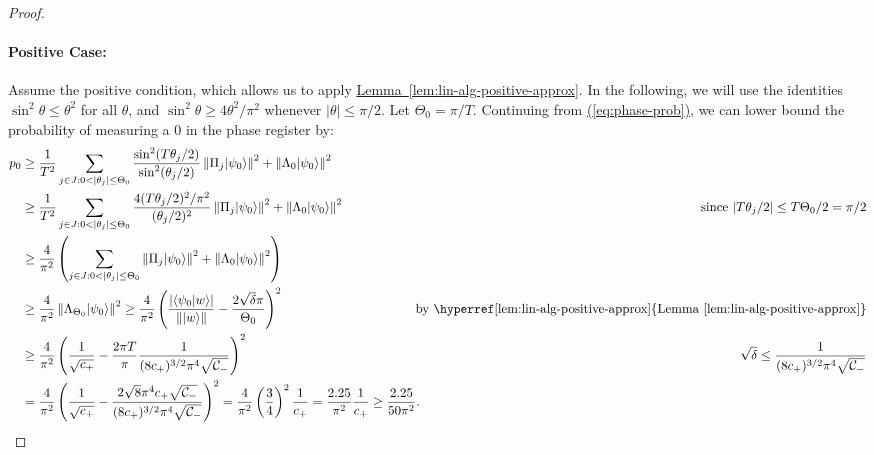 \documentclass{article}
\newcommand{\eq}[1]{\hyperref[eq:#1]{(\ref*{eq:#1})}}
\newcommand{\lem}[1]{\hyperref[lem:#1]{Lemma~\ref*{lem:#1}}}
\def\ket#1{{\lvert}#1\rangle}
\renewcommand{\>}{\rangle}
\newcommand{\<}{\langle}
\renewcommand{\(}{\left(}
\renewcommand{\)}{\right)}
\def\braket#1#2{{{\langle}#1\vert}#2\rangle}
\def\norm#1{\left\| #1 \right\|}
\begin{document}
\begin{proof}
\paragraph{Positive Case:} Assume the positive condition, which allows us to apply \lem{lin-alg-positive-approx}. In the following, we will use the identities $\sin^2\theta\leq \theta^2$ for all $\theta$, and $\sin^2\theta\geq 4\theta^2/\pi^2$ whenever $|\theta|\leq \pi/2$. 
Let $\Theta_0=\pi/T$. 
Continuing from \eq{phase-prob}, 
we can lower bound the probability of measuring a 0 in the phase register by:
\begin{align*}
p_0 &\geq \frac{1}{T^2}\sum_{j\in J:0<|\theta_j|\leq\Theta_0}\frac{\sin^2(T\theta_j/2)}{\sin^2(\theta_j/2)}\norm{\Pi_j\ket{\psi_0}}^2+\norm{\Lambda_0\ket{\psi_0}}^2\\
&\geq \frac{1}{T^2} \sum_{j\in J:0<|\theta_j|\leq\Theta_0}\frac{4(T\theta_j/2)^2/\pi^2}{(\theta_j/2)^2}\norm{\Pi_j\ket{\psi_0}}^2+\norm{\Lambda_0\ket{\psi_0}}^2 & \mbox{since }|T\theta_j/2|\leq T\Theta_0/2= \pi/2 \\
&\geq \frac{4}{\pi^2} \left(\sum_{j\in J:0<|\theta_j|\leq\Theta_0}\norm{\Pi_j\ket{\psi_0}}^2+\norm{\Lambda_0\ket{\psi_0}}^2 \right) \\
&\geq \frac{4}{\pi^2}\norm{\Lambda_{\Theta_0}\ket{\psi_0}}^2 \geq \frac{4}{\pi^2}\left(\frac{|\braket{\psi_0}{w}|}{\norm{\ket{w}}}-\frac{2\sqrt{\delta}\pi}{\Theta_0}\right)^2 & \mbox{by \lem{lin-alg-positive-approx}}\\
&\geq \frac{4}{\pi^2}\left(\frac{1}{\sqrt{c_+}}-\frac{2\pi T}{\pi}\frac{1}{(8c_+)^{3/2}\pi^4\sqrt{{\cal C}_-}}\right)^2 & \sqrt{\delta}\leq \frac{1}{(8c_+)^{3/2}\pi^4\sqrt{{\cal C}_-}}\\
&= \frac{4}{\pi^2}\left(\frac{1}{\sqrt{c_+}}-\frac{2\sqrt{8}\pi^4c_+\sqrt{{\cal C}_-}}{(8c_+)^{3/2}\pi^4\sqrt{{\cal C}_-}}\right)^2
= \frac{4}{\pi^2}\left(\frac{3}{4}\right)^2\frac{1}{c_+}
= \frac{2.25}{\pi^2}\frac{1}{c_+} \geq \frac{2.25}{50\pi^2}.\!\!\!\!\!\!\!\!
\end{align*}


\end{proof}
\end{document}
